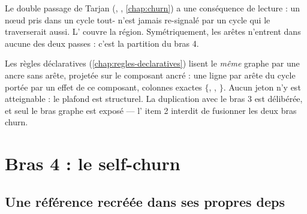 Le double passage de Tarjan (, , \cref{chap:churn}) a une conséquence de lecture : un nœud pris dans un cycle tout- n'est jamais re-signalé par un cycle  qui le traverserait aussi. L'\Error{} \og couvre\fg{} la région. Symétriquement, les arêtes  n'entrent dans aucune des deux passes : c'est la partition du bras 4.

\begin{decision}
Les règles déclaratives (\cref{chap:regles-declaratives}) lisent le \emph{même} graphe par une ancre  sans arête, projetée sur le composant ancré : une ligne par arête du cycle portée par un effet de ce composant, colonnes exactes $\{$, , $\}$. Aucun jeton  n'y est atteignable : le plafond \Warning{} est structurel. La duplication avec le bras 3 est délibérée, et seul le bras graphe est exposé --- l' item 2 interdit de fusionner les deux bras churn.
\end{decision}

\section{Bras 4 : le self-churn}
\label{sec:infinite-loop-self-churn}

\subsection{Une référence recréée dans ses propres deps}

